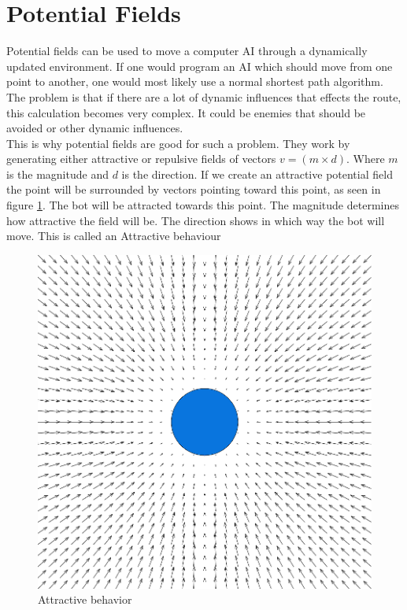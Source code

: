 \section{Potential Fields}
	Potential fields can be used to move a computer AI through a dynamically updated environment. 
	If one would program an AI which should move from one point to another, one would most likely use a normal shortest path algorithm. 
	The problem is that if there are a lot of dynamic influences that effects the route, this calculation becomes very complex. It could be 
	enemies that should be avoided or other dynamic influences. \\
	
	This is why potential fields are good for such a problem. They work by generating either attractive or repulsive fields of vectors $v=(m \times d)$. 
	Where $m$ is the magnitude and $d$ is the direction. 
	If we create an attractive potential field the point will be surrounded by vectors pointing toward this point, 
	as seen in figure \ref{fig:seekbehavior}. 
	The bot will be attracted towards this point. The magnitude determines how attractive the field will be. The direction shows in which way the bot will move. This is called an Attractive behaviour 
		
	\begin{figure}[H]
		\begin{center}
			\includegraphics[scale=0.3]{Figures/Potentialfields/seek.png}
			\caption{Attractive behavior\cite{pft}}\label{fig:seekbehavior}
		\end{center}
	\end{figure}
	
